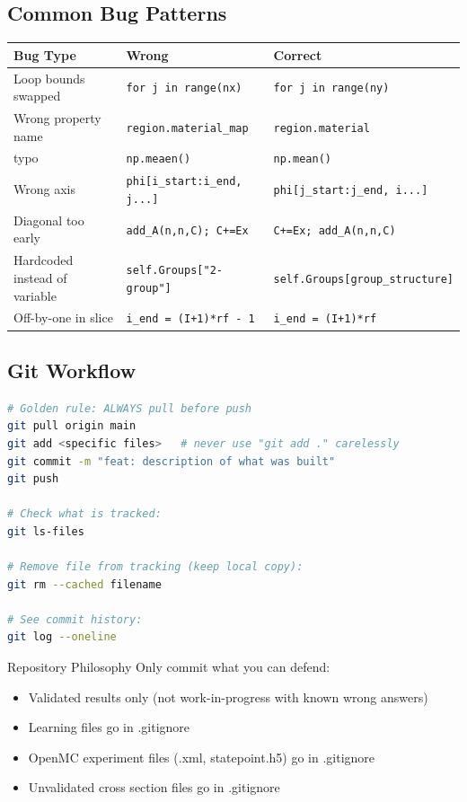 \documentclass[12pt,a4paper]{article}
\begin{document}
\subsection{Common Bug Patterns}

\begin{center}
\begin{longtable}{p{3.5cm} p{5cm} p{5cm}}
\toprule
\textbf{Bug Type} & \textbf{Wrong} & \textbf{Correct} \\
\midrule
Loop bounds swapped & \texttt{for j in range(nx)} & \texttt{for j in range(ny)} \\
Wrong property name & \texttt{region.material\_map} & \texttt{region.material} \\
typo & \texttt{np.meaen()} & \texttt{np.mean()} \\
Wrong axis & \texttt{phi[i\_start:i\_end, j...]} & \texttt{phi[j\_start:j\_end, i...]} \\
Diagonal too early & \texttt{add\_A(n,n,C); C+=Ex} & \texttt{C+=Ex; add\_A(n,n,C)} \\
Hardcoded instead of variable & \texttt{self.Groups["2-group"]} & \texttt{self.Groups[group\_structure]} \\
Off-by-one in slice & \texttt{i\_end = (I+1)*rf - 1} & \texttt{i\_end = (I+1)*rf} \\
\bottomrule
\end{longtable}
\end{center}

\subsection{Git Workflow}

\begin{lstlisting}[language=bash, caption={Standard Git Workflow}]
# Golden rule: ALWAYS pull before push
git pull origin main
git add <specific files>   # never use "git add ." carelessly
git commit -m "feat: description of what was built"
git push

# Check what is tracked:
git ls-files

# Remove file from tracking (keep local copy):
git rm --cached filename

# See commit history:
git log --oneline
\end{lstlisting}

\begin{lessonbox}{Repository Philosophy}
Only commit what you can defend:
\begin{itemize}
  \item Validated results only (not work-in-progress with known wrong answers)
  \item Learning files go in .gitignore
  \item OpenMC experiment files (.xml, statepoint.h5) go in .gitignore
  \item Unvalidated cross section files go in .gitignore
\end{itemize}
\end{lessonbox}
\end{document}
